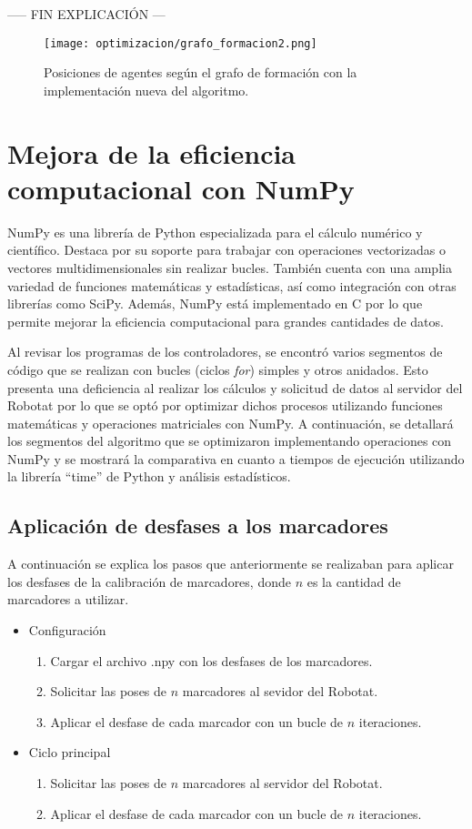 ----- FIN EXPLICACIÓN ---

\begin{figure}[H]
	\centering
	\texttt{[image: optimizacion/grafo\_formacion2.png]}
	\caption{Posiciones de agentes según el grafo de formación con la implementación nueva del algoritmo.}
	\label{fig:grafo_formacion2}
\end{figure}
	
\section{Mejora de la eficiencia computacional con NumPy}
NumPy es una librería de Python especializada para el cálculo numérico y científico. Destaca por su soporte para trabajar con operaciones vectorizadas o vectores multidimensionales sin realizar bucles. También cuenta con una amplia variedad de funciones matemáticas y estadísticas, así como integración con otras librerías como SciPy. Además, NumPy está implementado en C por lo que permite mejorar la eficiencia computacional para grandes cantidades de datos.

Al revisar los programas de los controladores, se encontró varios segmentos de código que se realizan con bucles (ciclos \textit{for}) simples y otros anidados. Esto presenta una deficiencia al realizar los cálculos y solicitud de datos al servidor del Robotat por lo que se optó por optimizar dichos procesos utilizando funciones matemáticas y operaciones matriciales con NumPy. A continuación, se detallará los segmentos del algoritmo que se optimizaron implementando operaciones con NumPy y se mostrará la comparativa en cuanto a tiempos de ejecución utilizando la librería ``time'' de Python y análisis estadísticos.

\subsection{Aplicación de desfases a los marcadores}
A continuación se explica los pasos que anteriormente se realizaban para aplicar los desfases de la calibración de marcadores, donde $n$ es la cantidad de marcadores a utilizar.

\begin{itemize}
	\item Configuración
	\begin{enumerate}
		\item Cargar el archivo .npy con los desfases de los marcadores.
		\item Solicitar las poses de $n$ marcadores al sevidor del Robotat.
		\item Aplicar el desfase de cada marcador con un bucle de $n$ iteraciones.
	\end{enumerate}
	\item Ciclo principal 
	\begin{enumerate}
		\item Solicitar las poses de $n$ marcadores al servidor del Robotat.
		\item Aplicar el desfase de cada marcador con un bucle de $n$ iteraciones.
	\end{enumerate}
\end{itemize}

